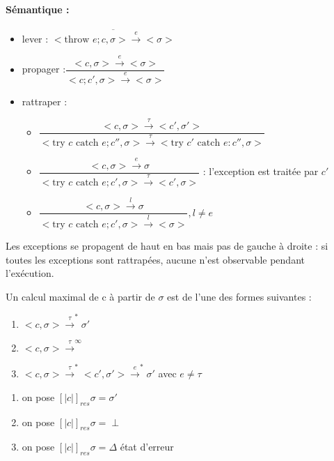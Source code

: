 \documentclass[10pt,a4paper]{article}
\newcommand{\semm}[1]{\left[| #1 | \right]}
\begin{document}
\paragraph*{Sémantique : }
\begin{itemize}
\item lever : $\overline{<\text{throw }e; c,\sigma> \xrightarrow{e} <\sigma>}$\\

\item propager :$\dfrac{<c, \sigma > \xrightarrow{e} <\sigma>}{<c;c', \sigma > \xrightarrow{e} <\sigma>}$ \\

\item rattraper : \begin{itemize}
\item $\dfrac{< c, \sigma > \xrightarrow{\tau} < c', \sigma' >}{<\text{try }c\text{ catch }e;c'', \sigma > \xrightarrow{\tau} <\text{try }c'\text{ catch }e:c'', \sigma > }$\\
\item  $\dfrac{< c, \sigma > \xrightarrow{e} \sigma}{<\text{try }c\text{ catch }e;c', \sigma > \xrightarrow{\tau} <c', \sigma > }$ : l'exception est traitée par $c'$\\
\item  $\dfrac{< c, \sigma > \xrightarrow{l} \sigma}{<\text{try }c\text{ catch }e;c', \sigma > \xrightarrow{l} < \sigma > }, l \not = e$
\end{itemize}
\end{itemize}
\begin{rem} Les exceptions se propagent de  haut en bas mais pas de gauche à droite :  si toutes les exceptions sont rattrapées, aucune n'est observable pendant l'exécution.
\end{rem}

\begin{thm} Un calcul maximal de c à partir de $\sigma$ est de l'une des formes suivantes : 
\begin{enumerate}
\item $<c, \sigma> \xrightarrow{\tau}^* \sigma'$
\item $<c, \sigma> \xrightarrow{\tau}^{\infty}$
\item $<c, \sigma> \xrightarrow{\tau}^* <c',\sigma'> \xrightarrow{e}^* \sigma'$ avec $e \not = \tau$
\end{enumerate}
\begin{enumerate}
\item on pose $\semm{c}_{res} \sigma = \sigma'$
\item on pose $\semm{c}_{res} \sigma = \perp$
\item on pose $\semm{c}_{res} \sigma = \Delta$ état d'erreur
\end{enumerate}
\end{thm}
\end{document}
